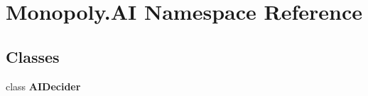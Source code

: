 \hypertarget{namespace_monopoly_1_1_a_i}{}\section{Monopoly.\+AI Namespace Reference}
\label{namespace_monopoly_1_1_a_i}
\subsection*{Classes}
\begin{DoxyCompactItemize}
\item 
class {\bfseries A\+I\+Decider}
\end{DoxyCompactItemize}
